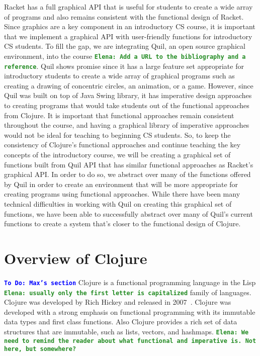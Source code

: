 \documentclass[12pt]{article}
\newcommand{\comment}[1]{{\bf \tt  {#1}}}
\newcommand{\emcomment}[1]{\textcolor{ForestGreen}{\comment{Elena: {#1}}}}
\newcommand{\todo}[1]{\textcolor{blue}{\comment{To Do: {#1}}}}
\begin{document}
Racket has a full graphical API that is useful for students to create a wide array of programs and also remains consistent with the functional design of Racket. Since graphics are a key component in an introductory CS course, it is important that we implement a graphical API with user-friendly functions for introductory CS students. To fill the gap, we are integrating Quil, an open source graphical environment, into the course \emcomment{Add a URL to the bibliography and a reference}. Quil shows promise since it has a large feature set appropriate for introductory students to create a wide array of graphical programs such as creating a drawing of concentric circles, an animation, or a game. However, since Quil was built on top of Java Swing library, it has imperative design approaches to creating programs that would take students out of the functional approaches from Clojure. It is important that functional approaches remain consistent throughout the course, and having a graphical library of imperative approaches would not be ideal for teaching to beginning CS students. So, to keep the consistency of Clojure's functional approaches and continue teaching the key concepts of the introductory course, we will be creating a graphical set of functions built from Quil API that has similar functional approaches as Racket's graphical API. In order to do so, we abstract over many of the functions offered by Quil in order to create an environment that will be more appropriate for creating programs using functional approaches. While there have been many technical difficulties in working with Quil on creating this graphical set of functions, we have been able to successfully abstract over many of Quil's current functions to create a system that’s closer to the functional design of Clojure.

\section{Overview of Clojure}\label{sec:clojure}
\todo{Max's section}
Clojure is a functional programming language in the Lisp \emcomment{usually only the first letter is capitalized} family of languages. Clojure was developed by Rich Hickey and released in 2007~\cite{Hickey:2008}. Clojure was developed with a strong emphasis on functional programming with its immutable data types and first class functions. Also Clojure provides a rich set of data structures that are immutable, such as lists, vectors, and hashmaps.
\emcomment{We need to remind the reader about what functional and imperative is. Not here, but somewhere?}
\end{document}
